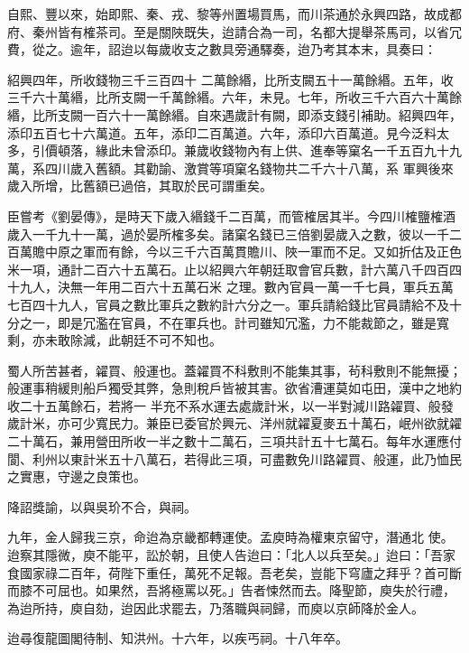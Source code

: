 \begin{pinyinscope}
 自熙、豐以來，始即熙、秦、戎、黎等州置場買馬，而川茶通於永興四路，故成都府、秦州皆有榷茶司。至是關陜既失，迨請合為一司，名都大提舉茶馬司，以省冗費，從之。逾年，詔迨以每歲收支之數具旁通驛奏，迨乃考其本末，具奏曰：



 紹興四年，所收錢物三千三百四十
 二萬餘緡，比所支闕五十一萬餘緡。五年，收三千六十萬緡，比所支闕一千萬餘緡。六年，未見。七年，所收三千六百六十萬餘緡，比所支闕一百六十一萬餘緡。自來遇歲計有闕，即添支錢引補助。紹興四年，添印五百七十六萬道。五年，添印二百萬道。六年，添印六百萬道。見今泛料太多，引價頓落，緣此未曾添印。兼歲收錢物內有上供、進奉等窠名一千五百九十九萬，系四川歲入舊額。其勸諭、激賞等項窠名錢物共二千六十八萬，系
 軍興後來歲入所增，比舊額已過倍，其取於民可謂重矣。



 臣嘗考《劉晏傳》，是時天下歲入緡錢千二百萬，而管榷居其半。今四川榷鹽榷酒歲入一千九十一萬，過於晏所榷多矣。諸窠名錢已三倍劉晏歲入之數，彼以一千二百萬贍中原之軍而有餘，今以三千六百萬貫贍川、陜一軍而不足。又如折估及正色米一項，通計二百六十五萬石。止以紹興六年朝廷取會官兵數，計六萬八千四百四十九人，決無一年用二百六十五萬石米
 之理。數內官員一萬一千七員，軍兵五萬七百四十九人，官員之數比軍兵之數約計六分之一。軍兵請給錢比官員請給不及十分之一，即是冗濫在官員，不在軍兵也。計司雖知冗濫，力不能裁節之，雖是寬剩，亦未敢除減，此朝廷不可不知也。



 蜀人所苦甚者，糴買、般運也。蓋糴買不科敷則不能集其事，茍科敷則不能無擾；般運事稍緩則船戶獨受其弊，急則稅戶皆被其害。欲省漕運莫如屯田，漢中之地約收二十五萬餘石，若將一
 半充不系水運去處歲計米，以一半對減川路糴買、般發歲計米，亦可少寬民力。兼臣已委官於興元、洋州就糴夏麥五十萬石，岷州欲就糴二十萬石，兼用營田所收一半之數十二萬石，三項共計五十七萬石。每年水運應付閬、利州以東計米五十八萬石，若得此三項，可盡數免川路糴買、般運，此乃恤民之實惠，守邊之良策也。



 降詔獎諭，以與吳玠不合，與祠。



 九年，金人歸我三京，命迨為京畿都轉運使。孟庾時為權東京留守，潛通北
 使。迨察其隱微，庾不能平，訟於朝，且使人告迨曰：「北人以兵至矣。」迨曰：「吾家食國家祿二百年，荷陛下重任，萬死不足報。吾老矣，豈能下穹廬之拜乎？首可斷而膝不可屈也。如果然，吾將極罵以死。」告者悚然而去。降聖節，庾失於行禮，為迨所持，庾自劾，迨因此求罷去，乃落職與祠歸，而庾以京師降於金人。



 迨尋復龍圖閣待制、知洪州。十六年，以疾丐祠。十八年卒。




\end{pinyinscope}
